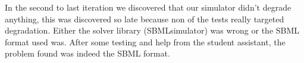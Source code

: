 \documentclass[a4paper]{article}
\begin{document}
In the second to last iteration we discovered that our simulator didn't degrade anything, this was discovered so late because non of the tests really targeted degradation. Either the solver library (SBMLsimulator) was wrong or the SBML format used was. After some testing and help from the student assistant, the problem found was indeed the SBML format.
\end{document}
